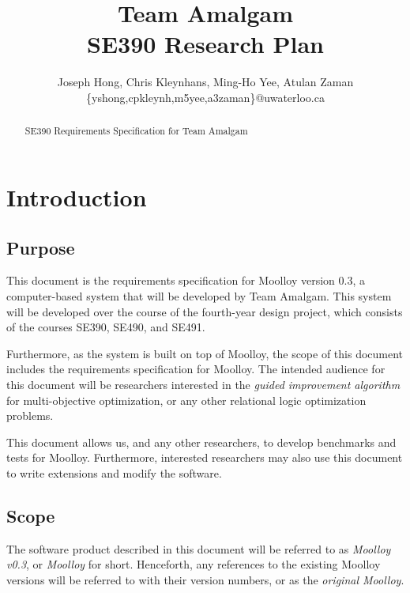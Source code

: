 \documentclass[11pt]{article}
\title{{\Large Team Amalgam} \\ SE390 Research Plan}
\author{Joseph Hong, Chris Kleynhans, Ming-Ho Yee, Atulan Zaman \\
        \{yshong,cpkleynh,m5yee,a3zaman\}@uwaterloo.ca}
\theoremstyle{definition}
\begin{document}
\maketitle

\begin{abstract}
SE390 Requirements Specification for Team Amalgam
\end{abstract}

\tableofcontents
\newpage

\section{Introduction}
\subsection{Purpose}

This document is the requirements specification for Moolloy version
0.3, a computer-based system that will be developed by Team Amalgam.
This system will be developed over the course of the fourth-year design
project, which consists of the courses SE390, SE490, and SE491.

Furthermore, as the system is built on top of Moolloy, the scope of
this document includes the requirements specification for Moolloy.
The intended audience for this document will be researchers interested
in the \textit{guided improvement algorithm} for multi-objective
optimization, or any other relational logic optimization problems.

This document allows us, and any other researchers, to develop
benchmarks and tests for Moolloy. Furthermore, interested researchers
may also use this document to write extensions and modify the software.

\subsection{Scope}

The software product described in this document will be referred to as
\textit{Moolloy v0.3}, or \textit{Moolloy} for short. Henceforth, any
references to the existing Moolloy versions will be referred to with
their version numbers, or as the \textit{original Moolloy}.
\end{document}
